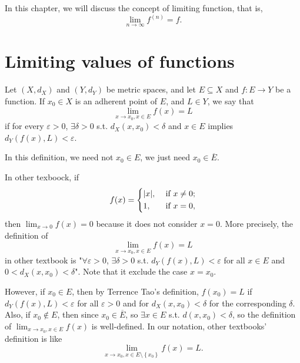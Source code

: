 In this chapter, we will discuss the concept of limiting function, that is, 
\[
    \lim_{n \to \infty} f^{(n)} = f. 
\]
\section{Limiting values of functions}
\begin{definition}
    Let \((X, d_X)\) and \((Y, d_Y)\) be metric spaces, and let \(E \subseteq X\) and \(f:E \to Y\) be a function. If \(x_0 \in X\) is an adherent point of \(E\), and \(L \in Y\), we say that 
    \[
        \lim_{x \to x_0, x \in E} f(x) = L  
    \] if for every \(\varepsilon > 0\), \(\exists \delta > 0\) s.t. \(d_X (x, x_0) < \delta \) and \(x \in E\) implies \(d_Y \left( f(x), L \right) < \varepsilon  \).            
\end{definition}

\begin{remark}
    In this definition, we need not \(x_0 \in E\), we just need \(x_0 \in \overline{E} \).  
\end{remark}

\begin{remark}
    In other texboock, if 
    \[
        f(x) = \begin{dcases}
            \vert x \vert , &\text{ if }  x \neq 0;\\
            1, &\text{ if }  x = 0,
        \end{dcases}
    \] then \(\lim_{x \to 0} f(x) = 0\) because it does not consider \(x = 0\). More precisely, the definition of
    \[
        \lim_{x \to x_0, x \in E} f(x) = L
    \]
    in other textbook is "\(\forall \varepsilon > 0\), \(\exists \delta > 0\) s.t. \(d_Y \left( f(x), L \right) < \varepsilon  \) for all \(x \in E\) and \(0 < d_X (x, x_0) < \delta \)". Note that it exclude the case \(x = x_0\). 
    
    However, if \(x_0 \in E\), then by Terrence Tao's definition, \(f(x_0) = L\) if \(d_Y \left( f(x), L \right) < \varepsilon  \) for all \(\varepsilon > 0\) and for \(d_X(x, x_0) < \delta \) for the corresponding \(\delta \). Also, if \(x_0 \notin E\), then since \(x_0 \in \overline{E} \), so \(\exists x \in E\) s.t. \(d(x, x_0) < \delta \), so the definition of \(\lim_{x \to x_0, x \in E} f(x)\) is well-defined. In our notation, other textbooks' definition is like
    \[
        \lim_{x \to x_0, x \in E \setminus \left\{ x_0 \right\} } f(x) = L. 
    \]     
\end{remark}

